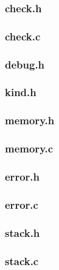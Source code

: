 \documentclass{article}
\begin{document}
\subsubsection{check.h}


\subsubsection{check.c}


\subsubsection{debug.h}


\subsubsection{kind.h}


\subsubsection{memory.h}


\subsubsection{memory.c}


\subsubsection{error.h}


\subsubsection{error.c}


\subsubsection{stack.h}


\subsubsection{stack.c}

\end{document}
